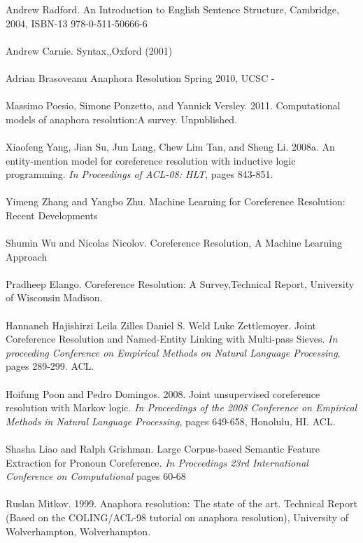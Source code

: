 \big[28\big] Andrew Radford. An Introduction to English Sentence Structure, Cambridge, 2004, ISBN-13 978-0-511-50666-6 \\  \\
\big[29\big] Andrew Carnie. Syntax,,Oxford (2001)\\  \\
\big[30\big] Adrian Brasoveanu Anaphora Resolution Spring 2010, UCSC - \\  \\
\big[31\big] Massimo Poesio, Simone Ponzetto, and Yannick Versley. 2011. Computational models of anaphora resolution:A survey. Unpublished. \\  \\
\big[32\big] Xiaofeng Yang, Jian Su, Jun Lang, Chew Lim Tan, and Sheng Li. 2008a. An entity-mention model for coreference resolution with inductive logic programming. \emph{In Proceedings of ACL-08: HLT}, pages 843-851.\\  \\
\big[33\big] Yimeng Zhang and  Yangbo Zhu. Machine Learning for Coreference Resolution: Recent Developments \\  \\
\big[34\big] Shumin Wu and Nicolas Nicolov. Coreference Resolution, A Machine Learning Approach  \\  \\
\big[35\big] Pradheep Elango. Coreference Resolution: A Survey,Technical Report, University of Wisconsin Madison.  \\  \\
\big[36\big] Hannaneh Hajishirzi Leila Zilles Daniel S. Weld Luke Zettlemoyer. Joint Coreference Resolution and Named-Entity Linking with Multi-pass Sieves.   \emph{In proceeding Conference on Empirical Methods on Natural Language Processing}, pages 289-299. ACL. \\  \\
\big[37\big] Hoifung Poon and Pedro Domingos. 2008. Joint unsupervised coreference resolution with Markov logic. \emph{In Proceedings of the 2008 Conference on Empirical Methods in Natural Language Processing}, pages 649-658, Honolulu, HI. ACL. \\  \\
\big[38\big] Shasha Liao and Ralph Grishman. Large Corpus-based Semantic Feature Extraction for Pronoun Coreference. \emph{ In Proceedings 23rd International Conference on Computational}  pages 60-68 \\  \\
\big[39\big] Ruslan Mitkov. 1999. Anaphora resolution: The state of the art. Technical Report (Based on the COLING/ACL-98 tutorial on anaphora resolution), University of Wolverhampton, Wolverhampton. \\  \\
